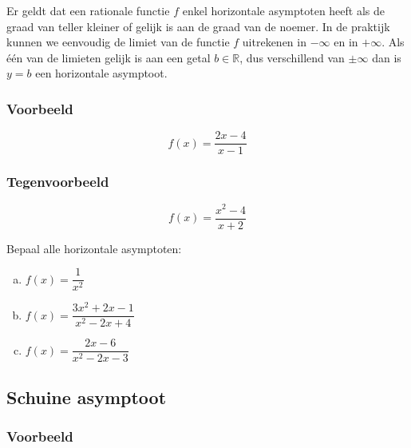 \documentclass[12pt,twoside,a4paper]{article}
\begin{document}
Er geldt dat een rationale functie $f$ enkel horizontale asymptoten heeft als de graad van teller kleiner of gelijk is aan de graad van de noemer. In de praktijk kunnen we eenvoudig de limiet van de functie $f$ uitrekenen in $-\infty$ en in $+\infty$. Als één van de limieten gelijk is aan een getal $b\in\mathbb{R}$, dus verschillend van $\pm\infty$ dan is $y=b$ een horizontale asymptoot.

\subsubsection*{Voorbeeld}
$$f(x)=\dfrac{2x-4}{x-1}$$

\subsubsection*{Tegenvoorbeeld}
$$f(x)=\dfrac{x^2-4}{x+2}$$

\begin{oefening}
Bepaal alle horizontale asymptoten:
\begin{enumerate}[(a)]
  \itemsep.5em
  \item $f(x)=\dfrac{1}{x^2}$
  \item $f(x)=\dfrac{3x^2+2x-1}{x^2-2x+4}$
  \item $f(x)=\dfrac{2x-6}{x^2-2x-3}$
\end{enumerate}
\end{oefening}

\subsection{Schuine asymptoot}

\subsubsection*{Voorbeeld}
\end{document}
